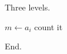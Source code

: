 \documentclass{article}
\begin{document}
Three levels.

\begin{algorithm}[h]
\caption{Nesting}
\begin{algorithmic}[1]
\State $m \gets a_i$
\State count it
\EndIf
\EndFor
\EndWhile
\end{algorithmic}
\end{algorithm}

End.
\end{document}
